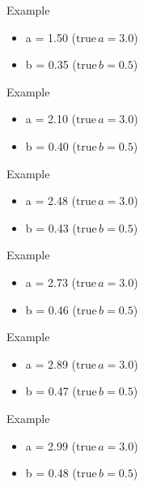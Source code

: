 \begin{frame}{Example}
  \begin{itemize}
    \item a = 1.50 ($\text{true}\, a = 3.0$)
    \item b = 0.35 ($\text{true}\, b = 0.5$)
  \end{itemize}
\end{frame}

\begin{frame}{Example}
  \begin{itemize}
    \item a = 2.10 ($\text{true}\, a = 3.0$)
    \item b = 0.40 ($\text{true}\, b = 0.5$)
  \end{itemize}
\end{frame}

\begin{frame}{Example}
  \begin{itemize}
    \item a = 2.48 ($\text{true}\, a = 3.0$)
    \item b = 0.43 ($\text{true}\, b = 0.5$)
  \end{itemize}
\end{frame}

\begin{frame}{Example}
  \begin{itemize}
    \item a = 2.73 ($\text{true}\, a = 3.0$)
    \item b = 0.46 ($\text{true}\, b = 0.5$)
  \end{itemize}
\end{frame}

\begin{frame}{Example}
  \begin{itemize}
    \item a = 2.89 ($\text{true}\, a = 3.0$)
    \item b = 0.47 ($\text{true}\, b = 0.5$)
  \end{itemize}
\end{frame}

\begin{frame}{Example}
  \begin{itemize}
    \item a = 2.99 ($\text{true}\, a = 3.0$)
    \item b = 0.48 ($\text{true}\, b = 0.5$)
  \end{itemize}
\end{frame}

